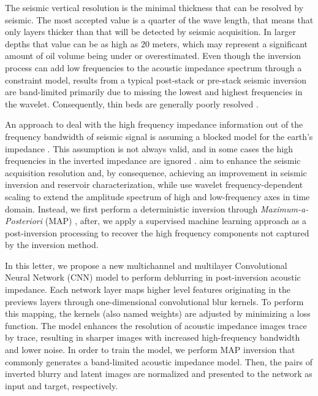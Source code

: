 \documentclass[journal]{IEEEtran}
\begin{document}
The seismic vertical resolution is the minimal thickness that
can be resolved by seismic. The most accepted value is a quarter
of the wave length, that means that only layers thicker than
that will be detected by seismic acquisition. In larger depths
that value can be as high as $20$ meters, which may represent a
significant amount of oil volume being under or overestimated.
Even though the inversion
process can add low frequencies to the acoustic impedance
spectrum through a constraint model, results from a typical
post-stack or pre-stack seismic inversion are band-limited
primarily due to missing the lowest and highest frequencies in the
wavelet. Consequently, thin beds are generally poorly resolved
\cite{Zhang2012}. 

An approach to deal with the high frequency
impedance information out of the frequency bandwidth of seismic signal
is assuming a blocked model for the earth's impedance \cite{Cook2010}.
This assumption is not always valid, and in some cases the high
frequencies in the inverted impedance are ignored \cite{YuanWang2015}.
\cite{xiaoiu} aim to enhance the seismic acquisition resolution and, by
consequence, achieving an improvement in seismic inversion and
reservoir characterization, while \cite{ChenWang2018} use wavelet
frequency-dependent scaling to extend the amplitude spectrum of
high and low-frequency axes in time domain. Instead, we first
perform a deterministic inversion through \textit{Maximum-a-Posteriori} (MAP) \cite{Buland2003,Figueiredo2012},
after, we apply a supervised machine learning approach as a post-inversion
processing to recover the high frequency components not captured by the inversion
method.

In this letter, we propose a new multichannel and multilayer
Convolutional Neural Network (CNN) model to perform deblurring
in post-inversion acoustic impedance. Each network layer maps
higher level features originating in the previews layers through
one-dimensional convolutional blur kernels. To perform this
mapping, the kernels (also named weights) are adjusted by
minimizing a loss function. The model enhances the resolution
of acoustic impedance images trace by trace, resulting in sharper
images with increased high-frequency bandwidth and lower noise.
In order to train the model, we perform MAP
inversion that commonly generates a band-limited acoustic impedance model.
Then, the pairs of inverted blurry and latent images are normalized and 
presented to the network as input and target, respectively.
\end{document}
